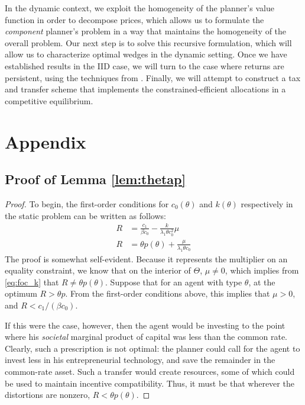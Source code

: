 \documentclass[11pt]{article}
\begin{document}
In the dynamic context, we exploit the homogeneity of the planner's value function in order to decompose prices, which allows us to formulate the \textit{component} planner's problem in a way that maintains the homogeneity of the overall problem. Our next step is to solve this recursive formulation, which will allow us to characterize optimal wedges in the dynamic setting. Once we have established results in the IID case, we will turn to the case where returns are persistent, using the techniques from \cite{farhi2013insurance}. Finally, we will attempt to construct a tax and transfer scheme that implements the constrained-efficient allocations in a competitive equilibrium. 



\newpage
\section*{Appendix}
\setcounter{equation}{0}
\renewcommand{\theequation}{A.\arabic{equation}}

\subsection*{Proof of Lemma \ref{lem:thetap}}
\begin{proof}
    To begin, the first-order conditions for \( c_0(\theta) \) and \( k(\theta) \) respectively in the static problem can be written as follows: 
    \begin{align}
        R&=\frac{c_{1}}{\beta c_{0}}-\frac{k}{\lambda_{1}\theta c_{0}^{2}}\mu \label{eq:foc_c0} \\ 
        R &= \theta p\left(\theta\right)+\frac{\mu}{\lambda_{1}\theta c_{0}} \label{eq:foc_k}
    \end{align}
    The proof is somewhat self-evident. Because it represents the multiplier on an equality constraint, we know that on the interior of \( \Theta \), \( \mu\ne 0 \), which implies from \eqref{eq:foc_k} that \( R \ne \theta p(\theta) \). Suppose that for an agent with type \( \theta \), at the optimum \( R>\theta p \). From the first-order conditions above, this implies that \( \mu>0 \), and \( R<c_1 / (\beta c_0) \).
    
    If this were the case, however, then the agent would be investing to the point where his \textit{societal} marginal product of capital was less than the common rate. Clearly, such a prescription is not optimal: the planner could call for the agent to invest less in his entrepreneurial technology, and save the remainder in the common-rate asset. Such a transfer would create resources, some of which could be used to maintain incentive compatibility. Thus, it must be that wherever the distortions are nonzero, \( R<\theta p(\theta) \). 
\end{proof}
\end{document}
